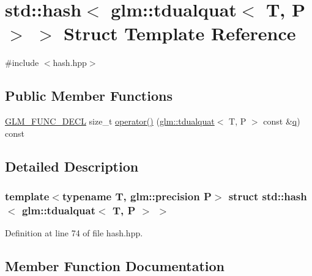 \hypertarget{structstd_1_1hash_3_01glm_1_1tdualquat_3_01_t_00_01_p_01_4_01_4}{}\section{std\+::hash$<$ glm\+::tdualquat$<$ T, P $>$ $>$ Struct Template Reference}
\label{structstd_1_1hash_3_01glm_1_1tdualquat_3_01_t_00_01_p_01_4_01_4}


{\ttfamily \#include $<$hash.\+hpp$>$}

\subsection*{Public Member Functions}
\begin{DoxyCompactItemize}
\item 
\mbox{\hyperlink{setup_8hpp_ab2d052de21a70539923e9bcbf6e83a51}{G\+L\+M\+\_\+\+F\+U\+N\+C\+\_\+\+D\+E\+CL}} size\+\_\+t \mbox{\hyperlink{structstd_1_1hash_3_01glm_1_1tdualquat_3_01_t_00_01_p_01_4_01_4_a7aa5ad5faca55261a8502ad2ff1d77fe}{operator()}} (\mbox{\hyperlink{structglm_1_1tdualquat}{glm\+::tdualquat}}$<$ T, P $>$ const \&\mbox{\hyperlink{glad_8h_a514729309336df22bcc8eda979d6ced4}{q}}) const
\end{DoxyCompactItemize}


\subsection{Detailed Description}
\subsubsection*{template$<$typename T, glm\+::precision P$>$\newline
struct std\+::hash$<$ glm\+::tdualquat$<$ T, P $>$ $>$}



Definition at line 74 of file hash.\+hpp.



\subsection{Member Function Documentation}
\mbox{\label{structstd_1_1hash_3_01glm_1_1tdualquat_3_01_t_00_01_p_01_4_01_4_a7aa5ad5faca55261a8502ad2ff1d77fe}} 
